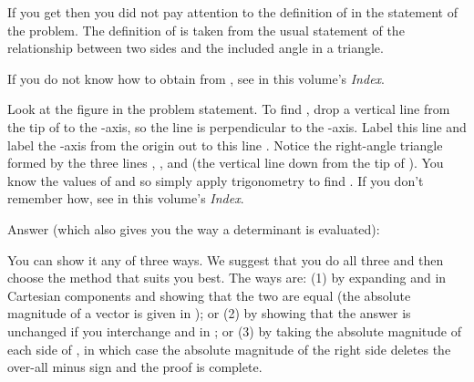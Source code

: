 {
{
}

{If you get
 then you did not pay  attention to the definition of \m{\gamma} in the
 statement of the problem.
 The definition of \m{\gamma} is taken from the usual statement of the
 relationship between two sides and the included angle in a triangle.
 \smallskip

 If you do not know how to obtain \m{\cos(\pi - \gamma)} from
 \m{\cos(\gamma)}, see  in this volume's
 \textit{Index}.
}

{Look at the figure in the problem statement.
 To find , drop a vertical line from the tip of  to
 the -axis, so the line is perpendicular to the -axis.
 Label this line  and label the -axis from the origin out to this
 line .
 Notice the right-angle triangle formed by the three lines , , and
  (the vertical line down from the tip of ).
 You know the values of  and \m{\phi} so simply apply trigonometry to
 find .
 If you don't remember how, see  in this
 volume's \textit{Index}.
}

{Answer (which also gives you the way a  determinant is evaluated):
}

{You can show it any of three ways.
We suggest that you do all three and then choose the method that suits you best.
The ways are:
(1) by expanding  and 
in Cartesian components and showing that the two are equal (the absolute magnitude of
a vector is given in ); or
(2) by showing that the answer is unchanged if you interchange  and  in ; or
(3) by taking the absolute magnitude of each side of
, in which case the
absolute magnitude of the right side deletes the over-all minus sign and the proof is complete.}

}
